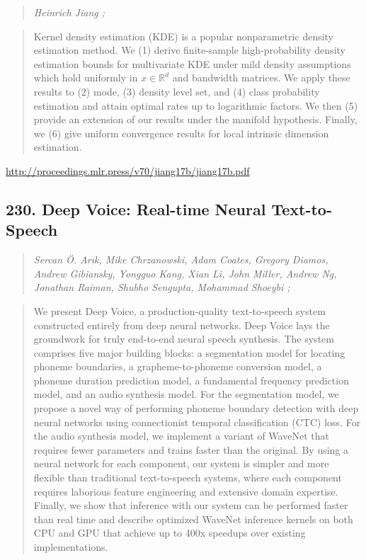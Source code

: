 \documentclass{article}
\begin{document}
\begin{quote}
\footnotesize{\textit{Heinrich Jiang ;}}
\end{quote}

\begin{quote}
    Kernel density estimation (KDE) is a popular nonparametric density estimation method. We (1) derive finite-sample high-probability density estimation bounds for multivariate KDE under mild density assumptions which hold uniformly in $x \in \mathbb{R}^d$ and bandwidth matrices. We apply these results to (2) mode, (3) density level set, and (4) class probability estimation and attain optimal rates up to logarithmic factors. We then (5) provide an extension of our results under the manifold hypothesis. Finally, we (6) give uniform convergence results for local intrinsic dimension estimation.  \end{quote}

\href{http://proceedings.mlr.press/v70/jiang17b/jiang17b.pdf}{http://proceedings.mlr.press/v70/jiang17b/jiang17b.pdf}

\subsection{230. Deep Voice: Real-time Neural Text-to-Speech}

\begin{quote}
\footnotesize{\textit{Sercan Ö. Arık, Mike Chrzanowski, Adam Coates, Gregory Diamos, Andrew Gibiansky, Yongguo Kang, Xian Li, John Miller, Andrew Ng, Jonathan Raiman, Shubho Sengupta, Mohammad Shoeybi ;}}
\end{quote}

\begin{quote}
    We present Deep Voice, a production-quality text-to-speech system constructed entirely from deep neural networks. Deep Voice lays the groundwork for truly end-to-end neural speech synthesis. The system comprises five major building blocks: a segmentation model for locating phoneme boundaries, a grapheme-to-phoneme conversion model, a phoneme duration prediction model, a fundamental frequency prediction model, and an audio synthesis model. For the segmentation model, we propose a novel way of performing phoneme boundary detection with deep neural networks using connectionist temporal classification (CTC) loss. For the audio synthesis model, we implement a variant of WaveNet that requires fewer parameters and trains faster than the original. By using a neural network for each component, our system is simpler and more flexible than traditional text-to-speech systems, where each component requires laborious feature engineering and extensive domain expertise. Finally, we show that inference with our system can be performed faster than real time and describe optimized WaveNet inference kernels on both CPU and GPU that achieve up to 400x speedups over existing implementations.  \end{quote}
\end{document}
